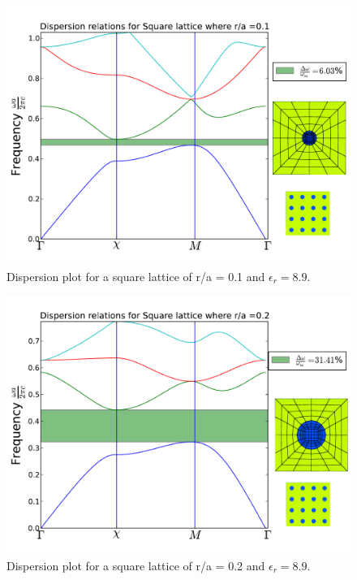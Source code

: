 \begin{figure}
\centering
\includegraphics[scale=0.6]{./img/square_lattice_ra01.pdf}
\caption{Dispersion plot for a square lattice of r/a = 0.1 and $\epsilon_r = 8.9$.}
\label{fig:dispersion_plot_ra01}
\end{figure}
\begin{figure}
\centering
\includegraphics[scale=0.6]{./img/square_lattice_ra02.pdf}
\caption{Dispersion plot for a square lattice of r/a = 0.2 and $\epsilon_r = 8.9$.}
\label{fig:dispersion_plot_ra02}
\end{figure}

